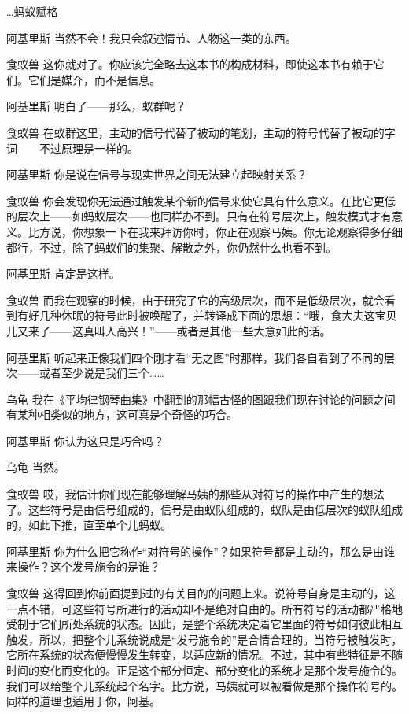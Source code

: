 \begin{dialog}{…蚂蚁赋格}
\begin{dialogue}
\item[阿基里斯]当然不会！我只会叙述情节、人物这一类的东西。

\item[食蚁兽]这你就对了。你应该完全略去这本书的构成材料，即使这本书有赖于它们。它们是媒介，而不是信息。

\item[阿基里斯]明白了——那么，蚁群呢？

\item[食蚁兽]在蚁群这里，主动的信号代替了被动的笔划，主动的符号代替了被动的字词——不过原理是一样的。

\item[阿基里斯]你是说在信号与现实世界之间无法建立起映射关系？

\item[食蚁兽]你会发现你无法通过触发某个新的信号来使它具有什么意义。在比它更低的层次上——如蚂蚁层次——也同样办不到。只有在符号层次上，触发模式才有意义。比方说，你想象一下在我来拜访你时，你正在观察马姨。你无论观察得多仔细都行，不过，除了蚂蚁们的集聚、解散之外，你仍然什么也看不到。

\item[阿基里斯]肯定是这样。

\item[食蚁兽]而我在观察的时候，由于研究了它的高级层次，而不是低级层次，就会看到有好几种休眠的符号此时被唤醒了，并转译成下面的思想：“哦，食大夫这宝贝儿又来了——这真叫人高兴！”——或者是其他一些大意如此的话。

\item[阿基里斯]听起来正像我们四个刚才看“无之图”时那样，我们各自看到了不同的层次——或者至少说是我们三个……

\item[乌龟]我在《平均律钢琴曲集》中翻到的那幅古怪的图跟我们现在讨论的问题之间有某种相类似的地方，这可真是个奇怪的巧合。

\item[阿基里斯]你认为这只是巧合吗？

\item[乌龟]当然。

\item[食蚁兽]哎，我估计你们现在能够理解马姨的那些从对符号的操作中产生的想法了。这些符号是由信号组成的，信号是由蚁队组成的，蚁队是由低层次的蚁队组成的，如此下推，直至单个儿蚂蚁。

\item[阿基里斯]你为什么把它称作“对符号的操作”？如果符号都是主动的，那么是由谁来操作？这个发号施令的是谁？

\item[食蚁兽]这得回到你前面提到过的有关目的的问题上来。说符号自身是主动的，这一点不错，可这些符号所进行的活动却不是绝对自由的。所有符号的活动都严格地受制于它们所处系统的状态。因此，是整个系统决定着它里面的符号如何彼此相互触发，所以，把整个儿系统说成是“发号施令的”是合情合理的。当符号被触发时，它所在系统的状态便慢慢发生转变，以适应新的情况。不过，其中有些特征是不随时间的变化而变化的。正是这个部分恒定、部分变化的系统才是那个发号施令的。我们可以给整个儿系统起个名字。比方说，马姨就可以被看做是那个操作符号的。同样的道理也适用于你，阿基。


\end{dialogue}
\end{dialog}
